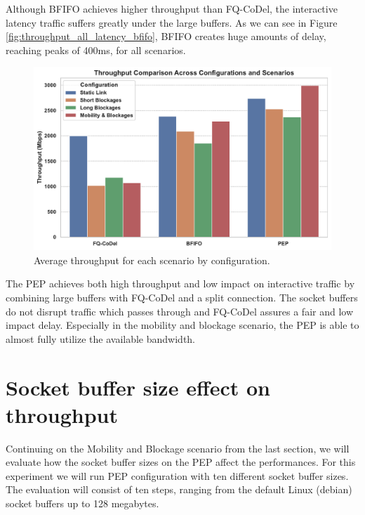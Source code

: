\documentclass[a4paper,english, 11pt]{report}
\begin{document}
Although BFIFO achieves higher throughput than FQ-CoDel, the interactive latency traffic suffers greatly under the large buffers. As we can see in Figure \ref{fig:throughput_all_latency_bfifo}, BFIFO creates huge amounts of delay, reaching peaks of 400ms, for all scenarios.\\

\begin{figure}[!h!] %
	\centering
	\includegraphics[scale=0.55]{../diagrams/witestlab/throughput/all.pdf}
  	\caption{Average throughput for each scenario by configuration.}
  	\label{fig:throughput_all}
\end{figure}

The PEP achieves both high throughput and low impact on interactive traffic by combining large buffers with FQ-CoDel and a split connection. The socket buffers do not disrupt traffic which passes through and FQ-CoDel assures a fair and low impact delay. Especially in the mobility and blockage scenario, the PEP is able to almost fully utilize the available bandwidth.\\

\section{Socket buffer size effect on throughput}
Continuing on the Mobility and Blockage scenario from the last section, we will evaluate how the socket buffer sizes on the PEP affect the performances. For this experiment we will run PEP configuration with ten different socket buffer sizes. The evaluation will consist of ten steps, ranging from the default Linux (debian) socket buffers up to 128 megabytes.\\
\end{document}
